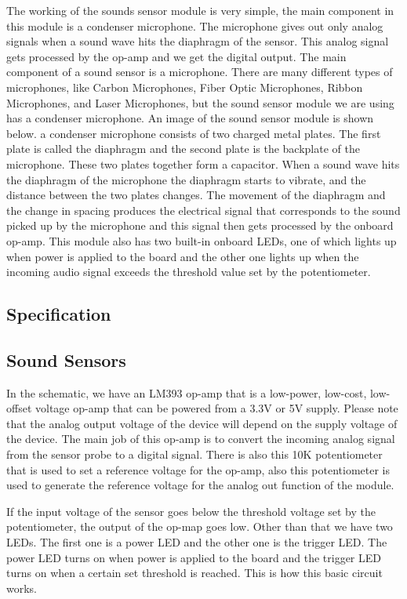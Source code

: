 The working of the sounds sensor module is very simple, the main component in this module is a condenser microphone. The microphone gives out only analog signals when a sound wave hits the diaphragm of the sensor. This analog signal gets processed by the op-amp and we get the digital output. The main component of a sound sensor is a microphone. There are many different types of microphones, like Carbon Microphones, Fiber Optic Microphones, Ribbon Microphones, and Laser Microphones, but the sound sensor module we are using has a condenser microphone. An image of the sound sensor module is shown below. a condenser microphone consists of two charged metal plates. The first plate is called the diaphragm and the second plate is the backplate of the microphone. These two plates together form a capacitor. When a sound wave hits the diaphragm of the microphone the diaphragm starts to vibrate, and the distance between the two plates changes. The movement of the diaphragm and the change in spacing produces the electrical signal that corresponds to the sound picked up by the microphone and this signal then gets processed by the onboard op-amp. This module also has two built-in onboard LEDs, one of which lights up when power is applied to the board and the other one lights up when the incoming audio signal exceeds the threshold value set by the potentiometer.



\subsection{Specification}
\subsection{Sound Sensors}

In the schematic, we have an LM393 op-amp that is a low-power, low-cost, low-offset voltage op-amp that can be powered from a 3.3V or 5V supply. Please note that the analog output voltage of the device will depend on the supply voltage of the device. The main job of this op-amp is to convert the incoming analog signal from the sensor probe to a digital signal. There is also this 10K potentiometer that is used to set a reference voltage for the op-amp, also this potentiometer is used to generate the reference voltage for the analog out function of the module.

If the input voltage of the sensor goes below the threshold voltage set by the potentiometer, the output of the op-map goes low. Other than that we have two LEDs. The first one is a power LED and the other one is the trigger LED. The power LED turns on when power is applied to the board and the trigger LED turns on when a certain set threshold is reached. This is how this basic circuit works.


